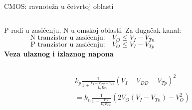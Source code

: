 \begin{frame}[label=09_2-s032]{CMOS: ravnoteža u četvrtoj oblasti}
\begin{columns}[T,onlytextwidth]\centering {}P radi u zasićenju, N u omskoj oblasti. Za dugačak kanal:\[\text{N tranzistor u zasićenju:}\quad V_O\le V_I-V_{Tn}\]
\[\text{P tranzistor u zasićenju:}\quad V_O\le V_I-V_{Tp}\]
\textbf{Veza ulaznog i izlaznog napona}\end{columns}
\[\begin{aligned}&k_p\frac1{1+\frac{V_I-V_{DD}-V_{Tp}}{L_pE_{Cp}}}(V_I-V_{DD}-V_{Tp})^2\\&=k_n\frac1{1+\frac{V_O}{L_nE_{Cn}}}\left(2V_O(V_I-V_{Tn})-V_O^2\right)\end{aligned}\]
\end{frame}
